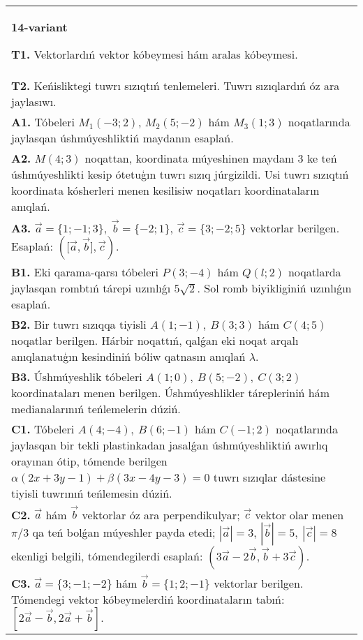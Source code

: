 \documentclass{article}
\begin{document}
\begin{tabular}{m{17cm}}
\textbf{14-variant}

\textbf{T1.} 
Vektorlardıń vektor kóbeymesi hám aralas kóbeymesi.
 \\
\textbf{T2.} 
Keńisliktegi tuwrı sızıqtıń tenlemeleri. Tuwrı sızıqlardıń óz ara jaylasıwı.
 \\
\textbf{A1.} 
Tóbeleri $M_1 (-3;2) $, $M_2 (5;-2) $ hám $M_3 (1;3) $
noqatlarında jaylasqan úshmúyeshliktiń maydanın esaplań.
 \\
\textbf{A2.} 
$M (4;3) $ noqattan, koordinata múyeshinen
maydanı 3 ke teń úshmúyeshlikti kesip ótetuģın tuwrı sızıq júrgizildi.
Usi tuwrı sızıqtıń koordinata kósherleri menen kesilisiw noqatları
koordinataların anıqlań.
 \\
\textbf{A3.} 
$\overrightarrow{a}
= \{ 1; - 1;3\}, \ \overrightarrow{b} = \{ - 2;1\}$, $\overrightarrow{c} = \{3; -2;5\}$ vektorlar berilgen. Esaplań:
$ (\lbrack\overrightarrow{a},\overrightarrow{b}\rbrack,\overrightarrow{c}) $.
 \\
\textbf{B1.} 
Eki qarama-qarsı tóbeleri $P (3; -4) $ hám $Q (l;2) $ noqatlarda jaylasqan rombtıń tárepi uzınlıǵı \(5\sqrt{2}\). Sol romb biyikliginiń uzınlıǵın esaplań.
 \\
\textbf{B2.} 
Bir tuwrı sızıqqa tiyisli \(A (1;-1),\ B (3;3) \) hám
\(C (4;5) \) noqatlar berilgen. Hárbir noqattıń, qalǵan eki noqat arqalı anıqlanatuģın kesindiniń bóliw qatnasın anıqlań $\lambda$.
 \\
\textbf{B3.} 
Úshmúyeshlik tóbeleri \(A (1;0),\ B (5;-2),\ C (3;2) \)
koordinataları menen berilgen. Úshmúyeshlikler tárepleriniń hám
medianalarınıń teńlemelerin dúziń.
 \\
\textbf{C1.} 
Tóbeleri \(A (4;-4),\ B (6;-1) \) hám \(C (-1;2) \)
noqatlarında jaylasqan bir tekli plastinkadan jasalǵan úshmúyeshliktiń
awırlıq orayınan ótip, tómende berilgen 
\(\alpha (2x+3y-1) +\beta (3x-4y-3) =0\) tuwrı sızıqlar dástesine 
tiyisli tuwrınıń teńlemesin dúziń.
 \\
\textbf{C2.} 
$\vec{a}$ hám $\vec{b}$ vektorlar óz ara perpendikulyar; $\vec{c}$ vektor olar menen $\pi/3$ qa teń bolǵan múyeshler payda etedi; $|\vec{a}| = 3$, $|\vec{b}| = 5,\ |\vec{c}| = 8$ ekenligi belgili, tómendegilerdi esaplań:
$\left(3\vec{a} - 2\vec{b},\vec{b} + 3\vec{c} \right) $.
 \\
\textbf{C3.} 
$\vec{a} = \{ 3; - 1; - 2\}$ hám $\vec{b} = \{ 1;2; - 1\}$ vektorlar berilgen. Tómendegi vektor kóbeymelerdiń koordinataların tabıń:
$\left\lbrack 2\vec{a} - \vec{b},2\vec{a} + \vec{b} \right\rbrack$.
 \\

\end{tabular}
\vspace{1cm}
\end{document}
